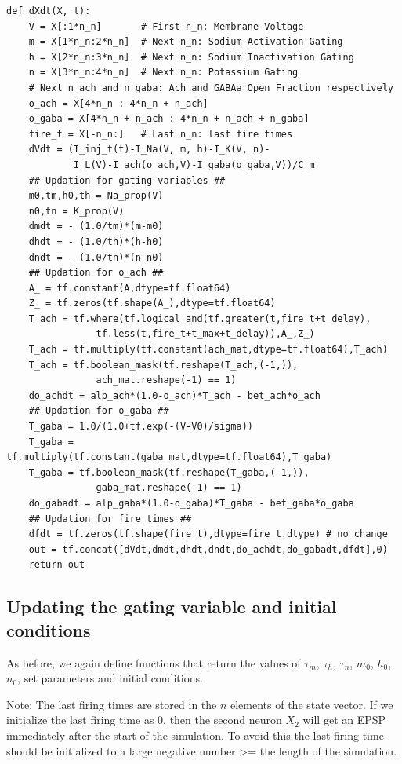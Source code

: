 \documentclass[10pt,letterpaper]{article}
\begin{document}
\begin{nolinenumbers}
\begin{verbatim}
def dXdt(X, t):
    V = X[:1*n_n]       # First n_n: Membrane Voltage
    m = X[1*n_n:2*n_n]  # Next n_n: Sodium Activation Gating
    h = X[2*n_n:3*n_n]  # Next n_n: Sodium Inactivation Gating
    n = X[3*n_n:4*n_n]  # Next n_n: Potassium Gating
    # Next n_ach and n_gaba: Ach and GABAa Open Fraction respectively
    o_ach = X[4*n_n : 4*n_n + n_ach]
    o_gaba = X[4*n_n + n_ach : 4*n_n + n_ach + n_gaba] 
    fire_t = X[-n_n:]   # Last n_n: last fire times
    dVdt = (I_inj_t(t)-I_Na(V, m, h)-I_K(V, n)-
    		I_L(V)-I_ach(o_ach,V)-I_gaba(o_gaba,V))/C_m 
    ## Updation for gating variables ##
    m0,tm,h0,th = Na_prop(V)
    n0,tn = K_prop(V)
    dmdt = - (1.0/tm)*(m-m0)
    dhdt = - (1.0/th)*(h-h0)
    dndt = - (1.0/tn)*(n-n0)
    ## Updation for o_ach ##
    A_ = tf.constant(A,dtype=tf.float64)
    Z_ = tf.zeros(tf.shape(A_),dtype=tf.float64)
    T_ach = tf.where(tf.logical_and(tf.greater(t,fire_t+t_delay),
    			tf.less(t,fire_t+t_max+t_delay)),A_,Z_) 
    T_ach = tf.multiply(tf.constant(ach_mat,dtype=tf.float64),T_ach)
    T_ach = tf.boolean_mask(tf.reshape(T_ach,(-1,)),
    			ach_mat.reshape(-1) == 1)
    do_achdt = alp_ach*(1.0-o_ach)*T_ach - bet_ach*o_ach
    ## Updation for o_gaba ##
    T_gaba = 1.0/(1.0+tf.exp(-(V-V0)/sigma))
    T_gaba = tf.multiply(tf.constant(gaba_mat,dtype=tf.float64),T_gaba)
    T_gaba = tf.boolean_mask(tf.reshape(T_gaba,(-1,)),
    			gaba_mat.reshape(-1) == 1)
    do_gabadt = alp_gaba*(1.0-o_gaba)*T_gaba - bet_gaba*o_gaba
    ## Updation for fire times ##
    dfdt = tf.zeros(tf.shape(fire_t),dtype=fire_t.dtype) # no change
    out = tf.concat([dVdt,dmdt,dhdt,dndt,do_achdt,do_gabadt,dfdt],0)
    return out
\end{verbatim}

\subsection*{Updating the gating variable and initial conditions}

As before, we again define functions that return the values of $\tau_m$, $\tau_h$, $\tau_n$, $m_0$, $h_0$, $n_0$, set parameters and initial conditions. 

Note: The last firing times are stored in the $n$ elements of the state vector. If we initialize the last firing time as 0, then the second neuron $X_2$ will get an EPSP immediately after the start of the simulation. To avoid this the last firing time should be initialized to a large negative number >= the length of the simulation.


\end{nolinenumbers}
\end{document}
